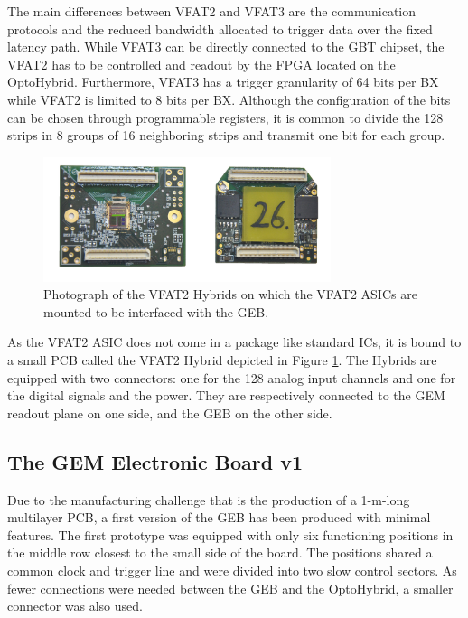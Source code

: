       The main differences between VFAT2 and VFAT3 are the communication protocols and the reduced bandwidth allocated to trigger data over the fixed latency path. While VFAT3 can be directly connected to the GBT chipset, the VFAT2 has to be controlled and readout by the FPGA located on the OptoHybrid. Furthermore, VFAT3 has a trigger granularity of 64 bits per BX while VFAT2 is limited to 8 bits per BX. Although the configuration of the bits can be chosen through programmable registers, it is common to divide the 128 strips in 8 groups of 16 neighboring strips and transmit one bit for each group. \\

      \begin{figure}[b!]
        \centering
        \includegraphics[width=0.75\textwidth]{img/II-2-daq/vfat2-hybrid.jpg}
        \caption{Photograph of the VFAT2 Hybrids on which the VFAT2 ASICs are mounted to be interfaced with the GEB.}
        \label{fig:II-2-vfat2-hybrid}
      \end{figure}

      As the VFAT2 ASIC does not come in a package like standard ICs, it is bound to a small PCB called the VFAT2 Hybrid depicted in Figure \ref{fig:II-2-vfat2-hybrid}. The Hybrids are equipped with two connectors: one for the 128 analog input channels and one for the digital signals and the power. They are respectively connected to the GEM readout plane on one side, and the GEB on the other side.

    \subsection{The GEM Electronic Board v1}

      Due to the manufacturing challenge that is the production of a 1-m-long multilayer PCB, a first version of the GEB has been produced with minimal features. The first prototype was equipped with only six functioning positions in the middle row closest to the small side of the board. The positions shared a common clock and trigger line and were divided into two slow control sectors. As fewer connections were needed between the GEB and the OptoHybrid, a smaller connector was also used.

